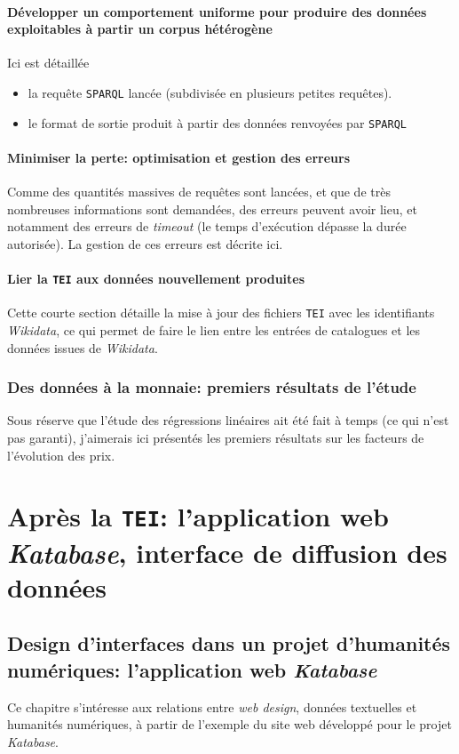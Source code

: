 \documentclass[a4paper, 12pt, twoside]{book}
\newcommand{\ktb}{\textit{Katabase}}
\newcommand{\sparql}{\texttt{SPARQL}}
\newcommand{\tei}{\texttt{TEI}}
\newcommand{\wkd}{\textit{Wikidata}}
\begin{document}
\subsection{Développer un comportement uniforme pour produire des données exploitables à partir un corpus hétérogène}
Ici est détaillée 
\begin{itemize}
	\item la requête \sparql{} lancée (subdivisée en plusieurs petites requêtes).
	\item le format de sortie produit à partir des données renvoyées par \sparql
\end{itemize}

\subsection{Minimiser la perte: optimisation et gestion des erreurs}
Comme des quantités massives de requêtes sont lancées, et que de très nombreuses informations sont demandées, des erreurs peuvent avoir lieu, et notamment des erreurs de \textit{timeout} (le temps d'exécution dépasse la durée autorisée). La gestion de ces erreurs est décrite ici.

\subsection{Lier la \tei{} aux données nouvellement produites}
Cette courte section détaille la mise à jour des fichiers \tei{} avec les identifiants \wkd{}, ce qui permet de faire le lien entre les entrées de catalogues et les données issues de \wkd{}.

\section{Des données à la monnaie: premiers résultats de l'étude}
Sous réserve que l'étude des régressions linéaires ait été fait à temps (ce qui n'est pas garanti), j'aimerais ici présentés les premiers résultats sur les facteurs de l'évolution des prix.


\part{Après la \tei{}: l'application web \ktb{}, interface de diffusion des données}
\chapter{Design d'interfaces dans un projet d'humanités numériques: l'application web \ktb{}}
Ce chapitre s'intéresse aux relations entre \textit{web design}, données textuelles et humanités numériques, à partir de l'exemple du site web développé pour le projet \ktb{}.
\end{document}
